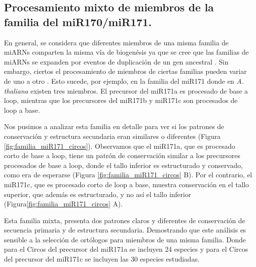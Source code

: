 \subsection{Procesamiento mixto de miembros de la familia del miR170/miR171.}

En general, se considera que diferentes miembros de una misma familia de miARNs comparten la misma vía de biogenésis ya que se cree que las familias de miARNs se expanden por eventos de duplicación de un gen ancestral \citep{pmid15565108}.
Sin embargo, ciertos el procesamiento de miembros de ciertas familias pueden variar de uno a otro \citep{Bologna2013}.
Esto sucede, por ejemplo, en la familia del miR171 donde en \textit{A. thaliana} existen tres miembros. 
El precursor del miR171a es procesado de base a loop, mientras que los precursores del miR171b y miR171c son procesados de loop a base.

Nos pusimos a analizar esta familia en detalle para ver si los patrones de conservación y estructura secundaria eran similares o diferentes (Figura \ref{fig:familia_miR171_circos}).
Observamos que el miR171a, que es procesado corto de base a loop, tiene un patrón de conservación similar a los precursores procesados de base a loop, donde el tallo inferior es estructurado y conservado, como era de esperarse (Figura \ref{fig:familia_miR171_circos} B).
Por el contrario, el miR171c, que es procesado corto de loop a base, muestra conservación en el tallo superior, que además es estructurado, y no así el tallo inferior (Figura\ref{fig:familia_miR171_circos} A).


Esta familia mixta, presenta dos patrones claros y diferentes de conservación de secuencia primaria y de estructura secundaria.
Demostrando que este análisis es sensible a la selección de ortólogos para miembros de una misma familia.
Donde para el Circos del precursor del miR171a se incluyen 24 especies y para el Circos del precursor del miR171c se incluyen las 30 especies estudiadas.



